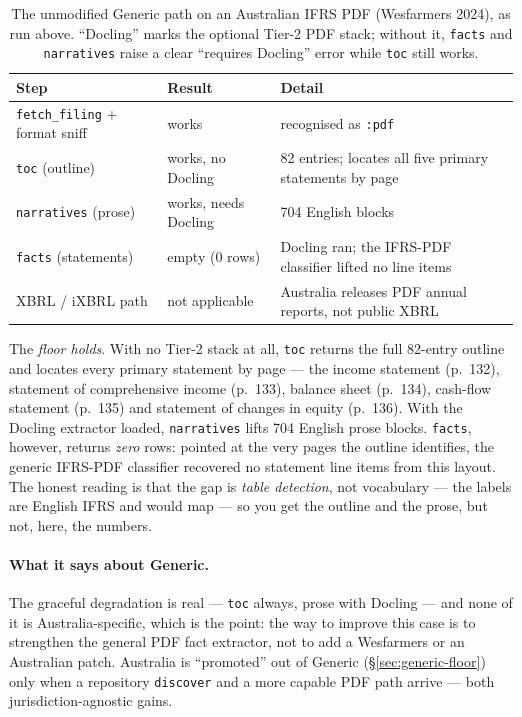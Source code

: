 \documentclass[11pt,a4paper]{report}
\begin{document}
\begin{table}[h]
\centering
\small
\caption{The unmodified Generic path on an Australian IFRS PDF (Wesfarmers 2024), as run above. ``Docling''
marks the optional Tier-2 PDF stack; without it, \texttt{facts} and \texttt{narratives} raise a clear
``requires Docling'' error while \texttt{toc} still works.}
\label{tab:generic-australia}
\begin{tabular}{@{}p{}p{}p{}@{}}
\toprule
\textbf{Step} & \textbf{Result} & \textbf{Detail} \\
\midrule
\texttt{fetch\_filing} + format sniff & works & recognised as \texttt{:pdf} \\
\texttt{toc} (outline) & works, no Docling & 82 entries; locates all five primary statements by page \\
\texttt{narratives} (prose) & works, needs Docling & 704 English blocks \\
\texttt{facts} (statements) & empty (0 rows) & Docling ran; the IFRS-PDF classifier lifted no line items \\
XBRL / iXBRL path & not applicable & Australia releases PDF annual reports, not public XBRL \\
\bottomrule
\end{tabular}
\end{table}

\noindent The \emph{floor holds}. With no Tier-2 stack at all, \texttt{toc} returns the full 82-entry outline
and locates every primary statement by page --- the income statement (p.~132), statement of comprehensive
income (p.~133), balance sheet (p.~134), cash-flow statement (p.~135) and statement of changes in equity
(p.~136). With the Docling extractor loaded, \texttt{narratives} lifts 704 English prose blocks. \texttt{facts},
however, returns \emph{zero} rows: pointed at the very pages the outline identifies, the generic IFRS-PDF
classifier recovered no statement line items from this layout. The honest reading is that the gap is \emph{table
detection}, not vocabulary --- the labels are English IFRS and would map --- so you get the outline and the
prose, but not, here, the numbers.

\paragraph{What it says about Generic.} The graceful degradation is real --- \texttt{toc} always, prose with
Docling --- and none of it is Australia-specific, which is the point: the way to improve this case is to
strengthen the general PDF fact extractor, not to add a Wesfarmers or an Australian patch. Australia is
``promoted'' out of Generic (\S\ref{sec:generic-floor}) only when a repository \texttt{discover} and a more
capable PDF path arrive --- both jurisdiction-agnostic gains.
\end{document}
